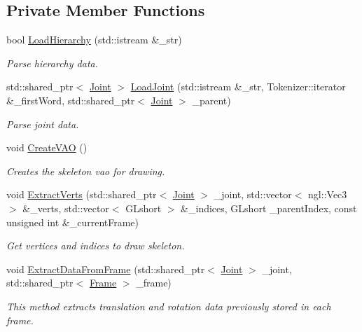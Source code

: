 \subsection*{Private Member Functions}
\begin{DoxyCompactItemize}
\item 
bool \hyperlink{class_skeleton_a584118808ccd4a174248a97a423c9b3f}{Load\+Hierarchy} (std\+::istream \&\+\_\+str)
\begin{DoxyCompactList}\small\item\em Parse hierarchy data. \end{DoxyCompactList}\item 
std\+::shared\+\_\+ptr$<$ \hyperlink{struct_joint}{Joint} $>$ \hyperlink{class_skeleton_af799626d6940e89cd691a811142b8c36}{Load\+Joint} (std\+::istream \&\+\_\+str, Tokenizer\+::iterator \&\+\_\+first\+Word, std\+::shared\+\_\+ptr$<$ \hyperlink{struct_joint}{Joint} $>$ \+\_\+parent)
\begin{DoxyCompactList}\small\item\em Parse joint data. \end{DoxyCompactList}\item 
void \hyperlink{class_skeleton_ad75fdf078c80de43d9c79c74a7b6dc5f}{Create\+V\+AO} ()\hypertarget{class_skeleton_ad75fdf078c80de43d9c79c74a7b6dc5f}{}\label{class_skeleton_ad75fdf078c80de43d9c79c74a7b6dc5f}

\begin{DoxyCompactList}\small\item\em Creates the skeleton vao for drawing. \end{DoxyCompactList}\item 
void \hyperlink{class_skeleton_ad426f8620296e4f8819556fe4f3c16cd}{Extract\+Verts} (std\+::shared\+\_\+ptr$<$ \hyperlink{struct_joint}{Joint} $>$ \+\_\+joint, std\+::vector$<$ ngl\+::\+Vec3 $>$ \&\+\_\+verts, std\+::vector$<$ G\+Lshort $>$ \&\+\_\+indices, G\+Lshort \+\_\+parent\+Index, const unsigned int \&\+\_\+current\+Frame)
\begin{DoxyCompactList}\small\item\em Get vertices and indices to draw skeleton. \end{DoxyCompactList}\item 
void \hyperlink{class_skeleton_a0bc65074541c9e198d8cb72d46d01e06}{Extract\+Data\+From\+Frame} (std\+::shared\+\_\+ptr$<$ \hyperlink{struct_joint}{Joint} $>$ \+\_\+joint, std\+::shared\+\_\+ptr$<$ \hyperlink{class_frame}{Frame} $>$ \+\_\+frame)
\begin{DoxyCompactList}\small\item\em This method extracts translation and rotation data previously stored in each frame. \end{DoxyCompactList}\end{DoxyCompactItemize}
